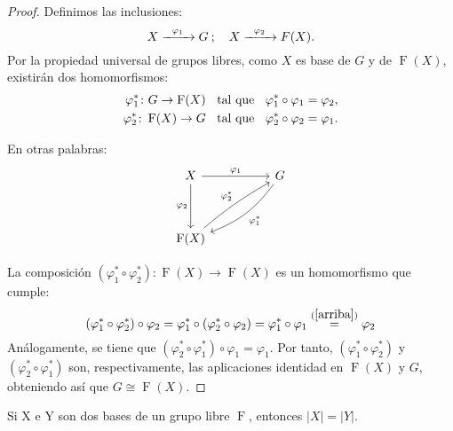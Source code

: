 \begin{proof}
Definimos las inclusiones:
\[
    X \xrightarrow[]{ \hspace{0.2cm} \varphi_1 \hspace{0.2cm}} G \: ; \quad X \xrightarrow[]{ \hspace{0.2cm} \varphi_2 \hspace{0.2cm}} F(X) .
\]
Por la propiedad universal de grupos libres, como $X$ es base de $G$ y de $\operatorname{F}(X)$, existirán dos homomorfismos:
\begin{align} \label{arriba}
    \varphi_1^* \colon G \rightarrow \operatorname{F}(X) \hspace{0.2cm} \text{ tal que }  \hspace{0.2cm} \varphi_1^* \circ \varphi_1 = \varphi_2, \\
    \varphi_2^* \colon \operatorname{F}(X) \rightarrow G  \hspace{0.2cm} \text{ tal que }  \hspace{0.2cm} \varphi_2^* \circ \varphi_2 = \varphi_1.
\end{align}

En otras palabras:
\[
\begin{tikzcd}
     X \arrow[rr]{}{\varphi_1} \arrow[dd, ']{}{\varphi_2} && G \arrow[ddll, bend right=-16]{}{\varphi_1^*}\\
     && \\
     \operatorname{F}(X) \arrow[uurr, bend right=-5]{}{\varphi_2^*} 
\end{tikzcd}
\]

La composición $(\varphi_1^* \circ \varphi_2^*) \colon \operatorname{F}(X) \rightarrow \operatorname{F}(X)$ es un homomorfismo que cumple:
\[
    (\varphi_1^* \circ \varphi_2^*) \circ \varphi_2 = \varphi_1^* \circ (\varphi_2^* \circ \varphi_2) = \varphi_1^* \circ \varphi_1 \overset{\mathrm{(\ref{arriba})}}{=} \varphi_2
\]
Análogamente, se tiene que $(\varphi_2^* \circ \varphi_1^*) \circ \varphi_1 = \varphi_1$. Por tanto,  $(\varphi_1^* \circ \varphi_2^*)$ y $(\varphi_2^* \circ \varphi_1^*)$ son, respectivamente, las aplicaciones identidad en $\operatorname{F}(X)$ y $G$, obteniendo así que $G \cong \operatorname{F}(X)$. \end{proof}






\newpage
\begin{theorem}
Si X e Y son dos bases de un grupo libre $\operatorname{F}$, entonces $|X| = |Y|$.
\end{theorem}

